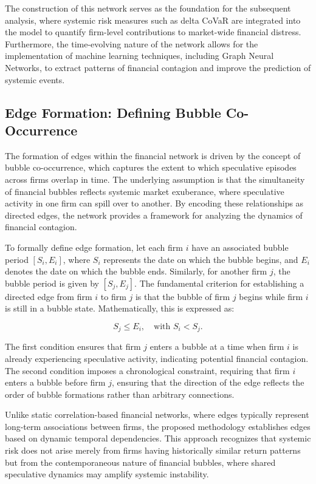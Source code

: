 \documentclass[preprint,12pt,authoryear]{elsarticle}
\begin{document}
The construction of this network serves as the foundation for the subsequent analysis, where systemic risk measures such as delta CoVaR are integrated into the model to quantify firm-level contributions to market-wide financial distress. Furthermore, the time-evolving nature of the network allows for the implementation of machine learning techniques, including Graph Neural Networks, to extract patterns of financial contagion and improve the prediction of systemic events.


\subsection{Edge Formation: Defining Bubble Co-Occurrence}  

The formation of edges within the financial network is driven by the concept of bubble co-occurrence, which captures the extent to which speculative episodes across firms overlap in time. The underlying assumption is that the simultaneity of financial bubbles reflects systemic market exuberance, where speculative activity in one firm can spill over to another. By encoding these relationships as directed edges, the network provides a framework for analyzing the dynamics of financial contagion.  

To formally define edge formation, let each firm \( i \) have an associated bubble period \([S_i, E_i]\), where \( S_i \) represents the date on which the bubble begins, and \( E_i \) denotes the date on which the bubble ends. Similarly, for another firm \( j \), the bubble period is given by \([S_j, E_j]\). The fundamental criterion for establishing a directed edge from firm \( i \) to firm \( j \) is that the bubble of firm \( j \) begins while firm \( i \) is still in a bubble state. Mathematically, this is expressed as:

\[
S_j \leq E_i, \quad \text{with } S_i < S_j.
\]

The first condition ensures that firm \( j \) enters a bubble at a time when firm \( i \) is already experiencing speculative activity, indicating potential financial contagion. The second condition imposes a chronological constraint, requiring that firm \( i \) enters a bubble before firm \( j \), ensuring that the direction of the edge reflects the order of bubble formations rather than arbitrary connections.  

Unlike static correlation-based financial networks, where edges typically represent long-term associations between firms, the proposed methodology establishes edges based on dynamic temporal dependencies. This approach recognizes that systemic risk does not arise merely from firms having historically similar return patterns but from the contemporaneous nature of financial bubbles, where shared speculative dynamics may amplify systemic instability.
\end{document}
